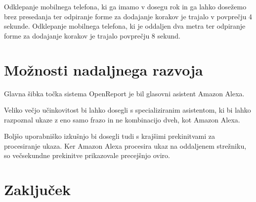 \documentclass[a4paper, 12pt]{book}
\begin{document}
Odklepanje mobilnega telefona, ki ga imamo v dosegu rok in ga lahko dosežemo brez presedanja ter odpiranje forme za dodajanje korakov je trajalo v povprečju 4 sekunde.
Odklepanje mobilnega telefona, ki je oddaljen dva metra ter odpiranje forme za dodajanje korakov je trajalo povprečju 8 sekund.

\chapter{Možnosti nadaljnega razvoja}

Glavna šibka točka sistema OpenReport je bil glasovni asistent Amazon Alexa.

Veliko večjo učinkovitost bi lahko dosegli s specializiranim asistentom, ki bi lahko razpoznal ukaze z eno samo frazo in ne kombinacijo dveh, kot Amazon Alexa.

Boljšo uporabniško izkušnjo bi dosegli tudi s krajšimi prekinitvami za procesiranje ukaza.
Ker Amazon Alexa procesira ukaz na oddaljenem strežniku, so večsekundne prekinitve prikazovale precejšnjo oviro.



\chapter{Zaključek}


\newpage %
\ \\
\clearpage
{}

\printbibliography
\end{document}
